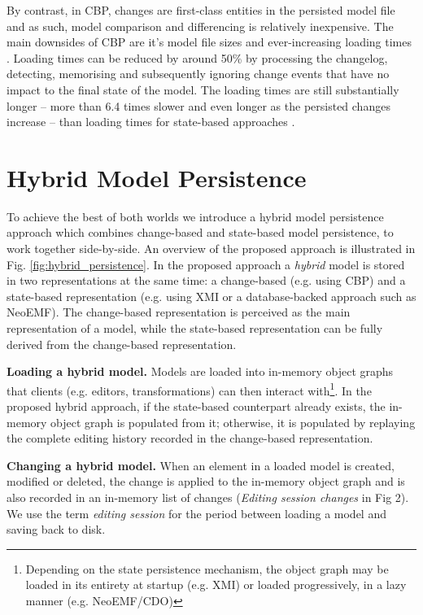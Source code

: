 \documentclass{llncs}
\begin{document}
By contrast, in CBP, changes are first-class entities in the persisted model file and as such, model comparison and differencing is relatively inexpensive. The main downsides of CBP are it's model file sizes \cite{DBLP:journals/entcs/RobbesL07,DBLP:conf/edoc/KoegelHLHD10} and ever-increasing loading times \cite{mens2002state}. Loading times can be reduced by around 50\% by processing the changelog, detecting, memorising and subsequently ignoring change events that have no impact to the final state of the model. The loading times are still substantially longer -- more than 6.4 times slower and even longer as the persisted changes increase -- than loading times for state-based approaches \cite{yohannis2018towards}. 

\vspace{-15pt}
\section{Hybrid Model Persistence}
\label{sec:hybrid_model_persistence}

\vspace{-15pt}
To achieve the best of both worlds we introduce a hybrid model persistence approach which combines change-based and state-based model persistence, to work together side-by-side. An overview of the proposed approach is illustrated in Fig. \ref{fig:hybrid_persistence}. In the proposed approach a \textit{hybrid} model is stored in two representations at the same time: a change-based (e.g. using CBP) and a state-based representation (e.g. using XMI or a database-backed approach such as NeoEMF). The change-based representation is perceived as the main representation of a model, while the state-based representation can be fully derived from the change-based representation.

\textbf{Loading a hybrid model.} Models are loaded into in-memory object graphs that clients (e.g. editors, transformations) can then interact with\footnote{Depending on the state persistence mechanism, the object graph may be loaded in its entirety at startup (e.g. XMI) or loaded progressively, in a lazy manner (e.g. NeoEMF/CDO)}. In the proposed hybrid approach, if the state-based counterpart already exists, the in-memory object graph is populated from it; otherwise, it is populated by replaying the complete editing history recorded in the change-based representation.

\textbf{Changing a hybrid model.} When an element in a loaded model is created, modified or deleted, the change is applied to the in-memory object graph and is also recorded in an in-memory list of changes (\textit{Editing session changes} in Fig 2). We use the term \emph{editing session} for the period between loading a model and saving back to disk. 
\end{document}
